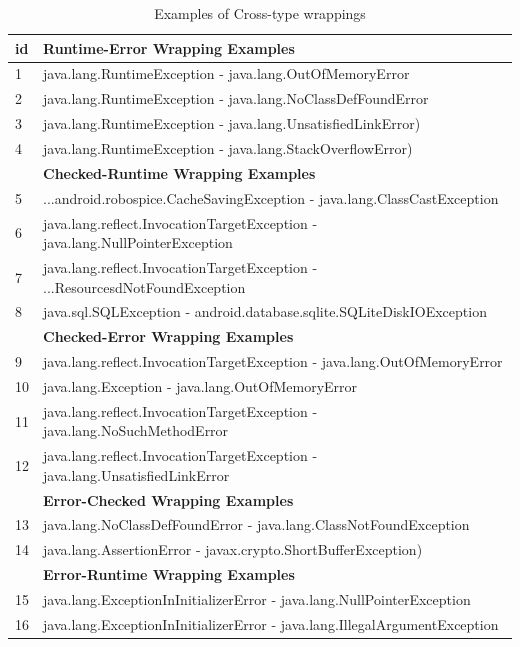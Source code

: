 \documentclass[conference]{IEEEtran}
\begin{document}
\begin{table}
\begin{tabular}{ll}
    \hline
 id & \bfseries{Runtime-Error Wrapping Examples}    \\  %
    \hline
1 & java.lang.RuntimeException - java.lang.OutOfMemoryError  \\ %
2 &java.lang.RuntimeException - java.lang.NoClassDefFoundError \\ %
3 &java.lang.RuntimeException - java.lang.UnsatisfiedLinkError)  \\ %
4& java.lang.RuntimeException -  java.lang.StackOverflowError)   \\ %
\hline
 & \bfseries{Checked-Runtime Wrapping Examples}   \\
 \hline
5& ...android.robospice.CacheSavingException - java.lang.ClassCastException   \\ %
6&java.lang.reflect.InvocationTargetException - java.lang.NullPointerException    \\ %
7&java.lang.reflect.InvocationTargetException - ...ResourcesdNotFoundException  \\ %
8&java.sql.SQLException - android.database.sqlite.SQLiteDiskIOException   \\ %
 \hline
& \bfseries{Checked-Error Wrapping Examples}  \\
 \hline
9&java.lang.reflect.InvocationTargetException - java.lang.OutOfMemoryError  \\ %
10&java.lang.Exception - java.lang.OutOfMemoryError   \\ %
11&java.lang.reflect.InvocationTargetException - java.lang.NoSuchMethodError 	 \\ %
12&java.lang.reflect.InvocationTargetException - java.lang.UnsatisfiedLinkError	 \\ %
\hline
& \bfseries{Error-Checked Wrapping Examples}  \\
 \hline
13&java.lang.NoClassDefFoundError - java.lang.ClassNotFoundException   \\ %
14&java.lang.AssertionError - javax.crypto.ShortBufferException)   \\ %
\hline
& \bfseries{Error-Runtime Wrapping Examples}    \\
 \hline
15&java.lang.ExceptionInInitializerError - java.lang.NullPointerException   \\ %
16&java.lang.ExceptionInInitializerError - java.lang.IllegalArgumentException 	 \\ %
 \hline
  \end{tabular}
\caption{Examples of Cross-type wrappings}
\label{tab:exampeswrap}
\end{table}
\end{document}
